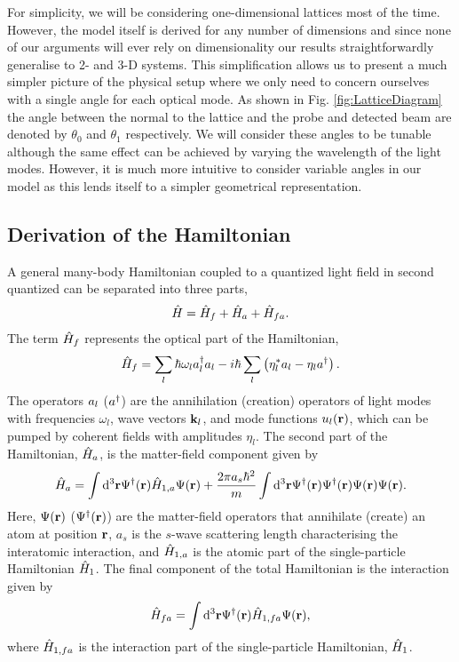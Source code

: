 For simplicity, we will be considering one-dimensional lattices most
of the time. However, the model itself is derived for any number of
dimensions and since none of our arguments will ever rely on
dimensionality our results straightforwardly generalise to 2- and 3-D
systems. This simplification allows us to present a much simpler
picture of the physical setup where we only need to concern ourselves
with a single angle for each optical mode. As shown in
Fig. \ref{fig:LatticeDiagram} the angle between the normal to the
lattice and the probe and detected beam are denoted by $\theta_0$ and
$\theta_1$ respectively. We will consider these angles to be tunable
although the same effect can be achieved by varying the wavelength of
the light modes. However, it is much more intuitive to consider
variable angles in our model as this lends itself to a simpler
geometrical representation.

\subsection{Derivation of the Hamiltonian}

A general many-body Hamiltonian coupled to a quantized light field in
second quantized can be separated into three parts,
\begin{equation}
\label{eq:TwoH}
  \hat{H} = \hat{H}_f + \hat{H}_a + \hat{H}_{fa}.
\end{equation}
The term $\hat{H}_f$ represents the optical part of the Hamiltonian,
\begin{equation}
\label{eq:Hf}
  \hat{H}_f = \sum_l \hbar \omega_l a^\dagger_l a_l -
  i \hbar \sum_l \left( \eta_l^* a_l - \eta_l a^\dagger \right).
\end{equation}
The operators $a_l$ ($a^\dagger$) are the annihilation (creation) operators
of light modes with frequencies $\omega_l$, wave vectors $\mathbf{k}_l$,
and mode functions $u_l(\mathbf{r})$, which can be pumped by coherent
fields with amplitudes $\eta_l$. The second part of the Hamiltonian,
$\hat{H}_a$, is the matter-field component given by
\begin{equation}
\label{eq:Ha}
  \hat{H}_a = \int \mathrm{d}^3 \mathbf{r} \Psi^\dagger(\mathbf{r}) \hat{H}_{1,a}
  \Psi(\mathbf{r}) + \frac{2 \pi a_s \hbar^2}{m} \int \mathrm{d}^3 \mathbf{r}
  \Psi^\dagger(\mathbf{r}) \Psi^\dagger(\mathbf{r}) \Psi(\mathbf{r}) \Psi(\mathbf{r}).
\end{equation}
Here, $\Psi(\mathbf{r})$ ($\Psi^\dagger(\mathbf{r})$) are the matter-field
operators that annihilate (create) an atom at position $\mathbf{r}$, $a_s$
is the $s$-wave scattering length characterising the interatomic
interaction, and $\hat{H}_{1,a}$ is the atomic part of the single-particle
Hamiltonian $\hat{H}_1$. The final component of the total Hamiltonian is
the interaction given by 
\begin{equation}
  \label{eq:Hfa}
  \hat{H}_{fa} = \int \mathrm{d}^3 \mathbf{r} \Psi^\dagger(\mathbf{r}) \hat{H}_{1,fa}
  \Psi(\mathbf{r}),
\end{equation}
where $\hat{H}_{1,fa}$ is the interaction part of the single-particle
Hamiltonian, $\hat{H}_1$.

